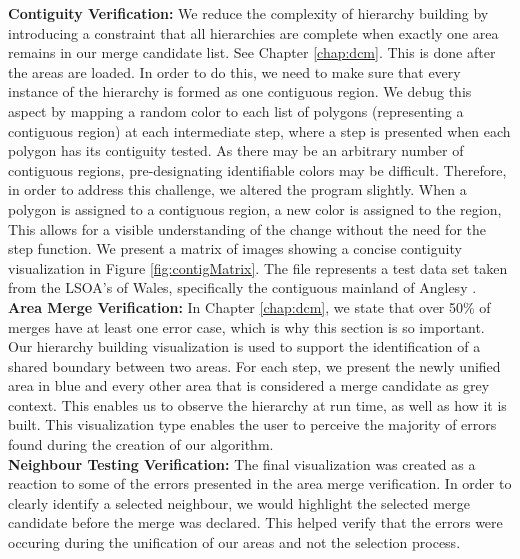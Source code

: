 \textbf{Contiguity Verification: } We reduce the complexity of hierarchy building by introducing a constraint that all hierarchies are complete when exactly one area remains in our merge candidate list. See Chapter \ref{chap:dcm}. This is done after the areas are loaded. In order to do this, we need to make sure that every instance of the hierarchy is formed as one contiguous region. We debug this aspect by mapping a random color to each list of polygons (representing a contiguous region) at each intermediate step, where a step is presented when each polygon has its contiguity tested. As there may be an arbitrary number of contiguous regions, pre-designating identifiable colors may be difficult. Therefore, in order to address this challenge, we altered the program slightly. When a polygon is assigned to a contiguous region, a new color is assigned to the region, This allows for a visible understanding of the change without the need for the step function. We present a matrix of images showing a concise contiguity visualization in Figure \ref{fig:contigMatrix}. The file represents a test data set taken from the LSOA's of Wales, specifically the contiguous mainland of Anglesy \cite{wales}.\\
\textbf{Area Merge Verification: } In Chapter \ref{chap:dcm}, we state that over 50\% of merges have at least one error case, which is why this section is so important. Our hierarchy building visualization is used to support the identification of a shared boundary between two areas. For each step, we present the newly unified area in blue and every other area that is considered a merge candidate as grey context. This enables us to observe the hierarchy at run time, as well as how it is built. This visualization type enables the user to perceive the majority of errors found during the creation of our algorithm.\\
\textbf{Neighbour Testing Verification: } The final visualization was created as a reaction to some of the errors presented in the area merge verification. In order to clearly identify a selected neighbour, we would highlight the selected merge candidate before the merge was declared. This helped verify that the errors were occuring during the unification of our areas and not the selection process.

